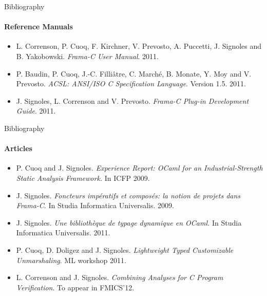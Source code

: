 \begin{frame}{Bibliography}
  \framesubtitle{Reference Manuals}
  \begin{itemize}
  \item L. Correnson, P. Cuoq, F. Kirchner, V. Prevosto, A. Puccetti,
    J. Signoles and B. Yakobowski. \emph{Frama-C User Manual}. 2011.
  \item P. Baudin, P. Cuoq, J.-C. Filli\^atre, C. March\'e, B. Monate, Y. Moy
    and V. Prevosto. \emph{ACSL: ANSI/ISO C Specification Language}. Version
    1.5. 2011.
  \item J. Signoles, L. Correnson and V. Prevosto. \emph{Frama-C Plug-in
    Development Guide}. 2011.
  \end{itemize}
\end{frame}

\begin{frame}{Bibliography}
  \framesubtitle{Articles}
  \begin{itemize}
  \item P. Cuoq and J. Signoles. \emph{Experience Report: OCaml for an
    Industrial-Strength Static Analysis Framework.} In ICFP 2009.
  \item J. Signoles. \emph{Foncteurs imp\'eratifs et compos\'es: la notion de
    projets dans Frama-C}. In Studia Informatica Universalis. 2009.
  \item J. Signoles. \emph{Une biblioth\`eque de typage dynamique en OCaml.} In
    Studia Informatica Universalis. 2011.
  \item P. Cuoq, D. Doligez and J. Signoles. \emph{Lightweight Typed
    Customizable Unmarshaling}. ML workshop 2011.
  \item L. Correnson and J. Signoles. \emph{Combining Analyses for C Program
    Verification}. To appear in FMICS'12.
  \end{itemize}
\end{frame}
